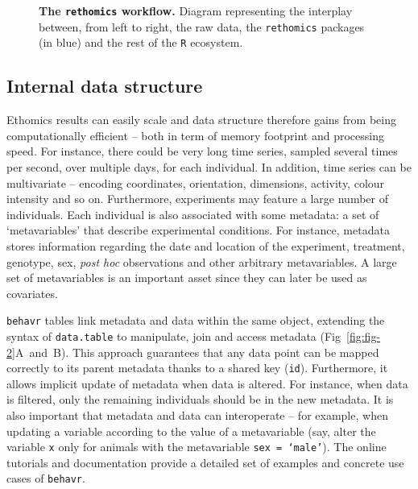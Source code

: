 \documentclass[10pt,letterpaper]{article}\usepackage[]{graphicx}\usepackage[]{color}
\begin{document}



\begin{figure}[!h]
	\caption{{\bf The \texttt{rethomics} workflow.}
		Diagram representing the interplay between, from left to right, the raw data, the \texttt{rethomics} packages (in blue) and the rest of the \texttt{R} ecosystem.}
	\label{fig:fig-1}
\end{figure}


\subsection*{Internal data structure}

Ethomics results can easily scale and data structure therefore gains from being computationally efficient -- both in term of memory footprint and processing speed.
For instance, there could be very long time series, sampled several times per second, over multiple days, for each individual. %
In addition, time series can be multivariate -- encoding coordinates, orientation, dimensions, activity, colour intensity and so on.
Furthermore, experiments may  feature a large number of individuals. %
Each individual is also associated with some metadata: a set of `metavariables' that describe experimental conditions.
For instance, metadata stores information regarding the date and location of the experiment, treatment, genotype, sex, \emph{post hoc} observations and other arbitrary metavariables.
A large set of metavariables is an important asset since they can later be used as covariates. 

\texttt{behavr} tables link metadata and data within the same object, extending the syntax of \texttt{data.table} to manipulate, join and access metadata (Fig~\ref{fig:fig-2}A~and~B).
This approach guarantees that any data point can be mapped correctly to its parent metadata thanks to a shared key (\texttt{id}).
Furthermore, it allows implicit update of metadata when data is altered.
For instance, when data is filtered, only the remaining individuals should be in the new metadata. 
It is also important that metadata and data can interoperate --
for example, when updating a variable according to the value of a metavariable (say, alter the variable \texttt{x} only for animals with the metavariable \texttt{sex = `male'}).
The online tutorials and documentation provide a detailed set of examples and concrete use cases of \texttt{behavr}. 
\end{document}
